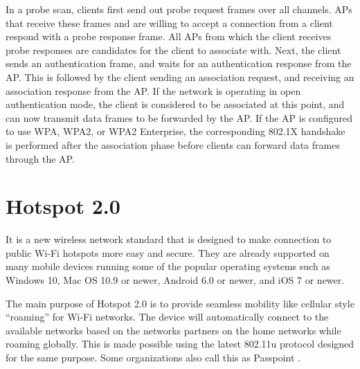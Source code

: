 In a probe scan, clients first send out probe request frames over all channels. APs that receive these frames and are willing to accept a connection from a client respond with a probe response frame. All APs from which the client receives probe responses are candidates for the client to associate with. Next, the client sends an authentication frame, and waits for an authentication response from the AP. This is followed by the client sending an association request, and receiving an association response from the AP. If the network is operating in open authentication mode, the client is considered to be
associated at this point, and can now transmit data frames to be forwarded by the AP. If the AP is configured to use WPA, WPA2, or WPA2 Enterprise, the corresponding 802.1X \cite{hostapd} handshake is performed after the association phase before clients can forward data frames through the AP.


\section{Hotspot 2.0 \cite{Hotspot_2.0_Definition}} \label{Hotspot2.0}

It is a new wireless network standard that is designed to make connection to public Wi-Fi hotspots more easy and secure. They are already supported on many mobile devices running some of the popular operating systems such as Windows 10, Mac OS 10.9 or newer, Android 6.0 or newer, and iOS 7 or newer.

The main purpose of Hotspot 2.0 is to provide seamless mobility like cellular style “roaming” for Wi-Fi networks. The device will automatically connect to the available networks based on the networks partners on the home networks while roaming globally. This is made possible using the latest 802.11u \cite{IEEE802.11u} protocol designed for the same purpose. Some organizations also call this as Passpoint \cite{Passpoint}.
